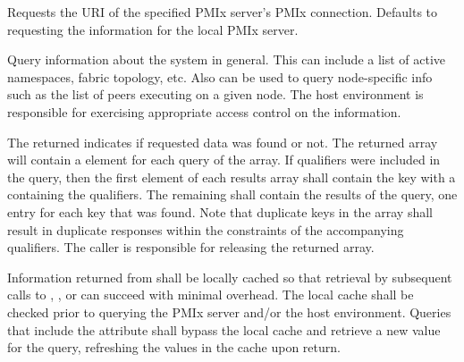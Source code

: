  Requests the URI of the specified \ac{PMIx} server's \ac{PMIx} connection. Defaults to requesting the information for the local \ac{PMIx} server.
\pasteAttributeItemEnd
{}

\optattrend

\descr

Query information about the system in general.
This can include a list of active namespaces, fabric topology, etc.
Also can be used to query node-specific info such as the list of peers executing on a given node. The host environment is responsible for exercising appropriate access control on the information.

The returned  indicates if requested data was found or not. The returned  array will contain a  element for each query of the  array. If qualifiers were included in the query, then the first element of each results array shall contain the  key with a  containing the qualifiers. The remaining  shall contain the results of the query, one entry for each key that was found. Note that duplicate keys in the  array shall result in duplicate responses within the constraints of the accompanying qualifiers. The caller is responsible for releasing the returned array.

\adviceimplstart
Information returned from  shall be locally cached so that retrieval by subsequent calls to , , or  can succeed with minimal overhead. The local cache shall be checked prior to querying the \ac{PMIx} server and/or the host environment. Queries that include the  attribute shall bypass the local cache and retrieve a new value for the query, refreshing the values in the cache upon return.
\adviceimplend


